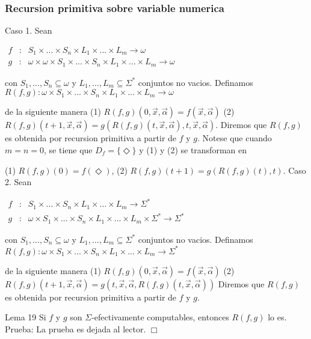 \subsubsection{Recursion primitiva sobre variable numerica}

Caso 1. Sean

\(\displaystyle \begin{array}{rcl} f & :& S_{1}\times ...\times S_{n}\times L_{1}\times ...\times L_{m}\rightarrow \omega \\ g & :& \omega \times \omega \times S_{1}\times ...\times S_{n}\times L_{1}\times ...\times L_{m}\rightarrow \omega \end{array} \)

con \(S_{1},...,S_{n}\subseteq \omega \) y \(L_{1},...,L_{m}\subseteq \Sigma ^{\ast }\) conjuntos no vacios. Definamos
\(\displaystyle R(f,g):\omega \times S_{1}\times ...\times S_{n}\times L_{1}\times ...\times L_{m}\rightarrow \omega \)

de la siguiente manera
(1) \(R(f,g)(0,\vec{x},\vec{\alpha})=f(\vec{x},\vec{\alpha})\)
(2) \(R(f,g)(t+1,\vec{x},\vec{\alpha})=g(R(f,g)(t,\vec{x},\vec{\alpha} ),t,\vec{x},\vec{\alpha}).\)
Diremos que \(R(f,g)\) es obtenida por recursion primitiva a partir de \(f\) y \(g.\) Notese que cuando \(m=n=0\), se tiene que \( D_{f}=\{\Diamond \}\) y (1) y (2) se transforman en

(1) \(R(f,g)(0)=f(\Diamond )\),
(2) \(R(f,g)(t+1)=g(R(f,g)(t),t)\).
Caso 2. Sean

\(\displaystyle \begin{array}{rcl} f & :& S_{1}\times ...\times S_{n}\times L_{1}\times ...\times L_{m}\rightarrow \Sigma ^{\ast } \\ g & :& \omega \times S_{1}\times ...\times S_{n}\times L_{1}\times ...\times L_{m}\times \Sigma ^{\ast }\rightarrow \Sigma ^{\ast } \end{array} \)

con \(S_{1},...,S_{n}\subseteq \omega \) y \(L_{1},...,L_{m}\subseteq \Sigma ^{\ast }\) conjuntos no vacios. Definamos
\(\displaystyle R(f,g):\omega \times S_{1}\times ...\times S_{n}\times L_{1}\times ...\times L_{m}\rightarrow \Sigma ^{\ast } \)

de la siguiente manera
(1) \(R(f,g)(0,\vec{x},\vec{\alpha})=f(\vec{x},\vec{\alpha})\)
(2) \(R(f,g)(t+1,\vec{x},\vec{\alpha})=g(t,\vec{x},\vec{\alpha} ,R(f,g)(t,\vec{x},\vec{\alpha}))\)
Diremos que \(R(f,g)\) es obtenida por recursion primitiva a partir de \(f\) y \(g.\)

Lema 19 Si \(f\) y \(g\) son \(\Sigma \)-efectivamente computables, entonces \(R(f,g)\) lo es.
Prueba: La prueba es dejada al lector. \(\Box\)

